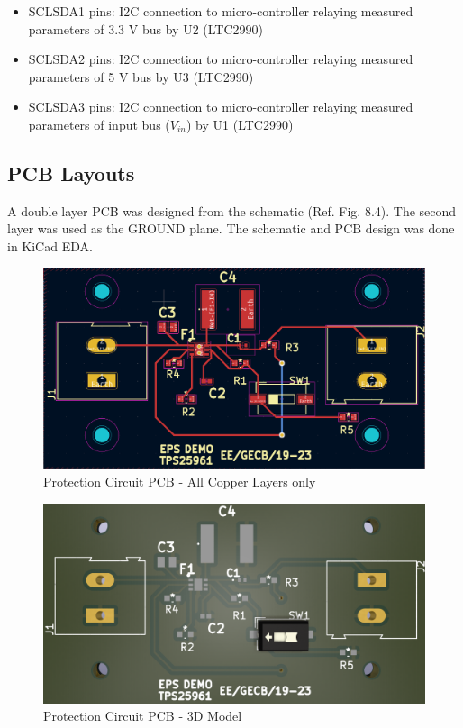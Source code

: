  \begin{itemize}
 
 

 	\item SCLSDA1 pins: I2C connection to micro-controller relaying measured parameters of 3.3 V bus by U2 (LTC2990) 
 	\item SCLSDA2 pins: I2C connection to micro-controller relaying measured parameters of 5 V bus by U3 (LTC2990) 
 	\item SCLSDA3 pins: I2C connection to micro-controller relaying measured parameters of input bus ($V_{in}$) by U1 (LTC2990)
 \end{itemize}


\subsection{PCB Layouts}
 A double layer PCB was designed from the schematic (Ref. Fig. 8.4). The second layer was used as the GROUND plane. The schematic and PCB design was done in KiCad EDA. 
 
  \begin{figure}[!ht]
 	\centering
 	\includegraphics[width=0.6\columnwidth]{IMGS/prot_circ_layout2.png}
 	\caption{\centering Protection Circuit PCB - All Copper Layers only}
 	\label{fig:prpcb}
 \end{figure}
 
   \begin{figure}[H]
 	\centering
 	\includegraphics[width=0.6\columnwidth]{IMGS/prot_circ_3d.png}
 	\caption{\centering Protection Circuit PCB - 3D Model}
 	\label{fig:prpcb3d}
 \end{figure}




